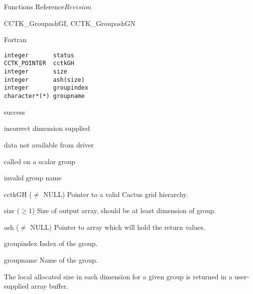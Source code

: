 \begin{cactuspart}{ Functions Reference}{}{$Revision$}
\begin{FunctionDescription}{CCTK\_GroupashGI, CCTK\_GroupashGN}
\begin{SynopsisSection}
\begin{Synopsis}{Fortran}
\begin{verbatim}
integer       status
CCTK_POINTER  cctkGH
integer       size
integer       ash(size)
integer       groupindex
character*(*) groupname
\end{verbatim}
\end{Synopsis}
\end{SynopsisSection}

\begin{ResultSection}
\begin{Result}{0} success \end{Result}
\begin{Result}{-1} incorrect dimension supplied \end{Result}
\begin{Result}{-2} data not available from driver \end{Result}
\begin{Result}{-3} called on a scalar group \end{Result}
\begin{Result}{-4} invalid group name \end{Result}
\end{ResultSection}

\begin{ParameterSection}
\begin{Parameter}{cctkGH ($\ne$ NULL)} Pointer to a valid Cactus grid hierarchy. \end{Parameter}
\begin{Parameter}{size ($\ge 1$)} Size of output array, should be at
least dimension of group. \end{Parameter}
\begin{Parameter}{ash ($\ne$ NULL)} Pointer to array which will hold the return values. \end{Parameter}
\begin{Parameter}{groupindex} Index of the group. \end{Parameter}
\begin{Parameter}{groupname} Name of the group. \end{Parameter}
\end{ParameterSection}

\begin{Discussion}
The local allocated size in each dimension for a given group is returned in a user-supplied array buffer.
\end{Discussion}


\end{FunctionDescription}
\end{cactuspart}
